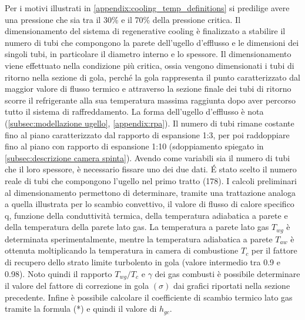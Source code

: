 Per i motivi illustrati in \autoref{appendix:cooling_temp_definitions} si predilige avere una pressione che sia tra il 30\% e il 70\% della pressione critica.
Il dimensionamento del sistema di regenerative cooling è finalizzato a stabilire il numero di tubi che compongono la parete dell'ugello d'efflusso e le dimensioni dei singoli tubi, in particolare il diametro interno e lo spessore. Il dimensionamento viene effettuato nella condizione più critica, ossia vengono dimensionati i tubi di ritorno nella sezione di gola, perché la gola rappresenta il punto caratterizzato dal maggior valore di flusso termico e attraverso la sezione finale dei tubi di ritorno scorre il refrigerante alla sua temperatura massima raggiunta dopo aver percorso tutto il sistema di raffreddamento. La forma dell'ugello d'efflusso è nota (\autoref{subsec:modellazione ugello}, \autoref{appendix:rpa}). Il numero di tubi rimane costante fino al piano caratterizzato dal rapporto di espansione 1:3, per poi raddoppiare fino al piano con rapporto di espansione 1:10 (sdoppiamento spiegato in \autoref{subsec:descrizione camera spinta}). Avendo come variabili sia il numero di tubi che il loro spessore, è necessario fissare uno dei due dati. \'E stato scelto il numero reale di tubi che compongono l'ugello nel primo tratto (178).
I calcoli preliminari al dimensionamento permettono di determinare, tramite una trattazione analoga a quella illustrata per lo scambio convettivo, il valore di flusso di calore specifico q, funzione della conduttività termica, della temperatura adiabatica a parete e della temperatura della parete lato gas. 
La temperatura a parete lato gas $T_{wg}$ è determinata sperimentalmente, mentre la temperatura adiabatica a parete $T_{aw}$ è ottenuta moltiplicando la temperatura in camera di combustione $T_c$ per il fattore di recupero dello strato limite turbolento in gola (valore intermedio tra 0.9 e 0.98). Noto quindi il rapporto $T_{wg}/T_c$ e $\gamma$ dei gas combusti è possibile determinare il valore del fattore di correzione in gola $\left( \sigma \right)$ dai grafici riportati nella sezione precedente. Infine è possibile calcolare il coefficiente di scambio termico lato gas tramite la formula (*)
e quindi il valore di $h_{gc}$.

